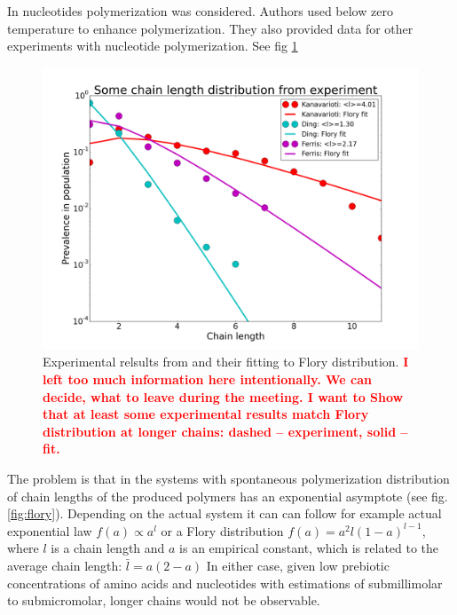 \documentclass[journal=jacsat,manuscript=article,layout=twocolumn]{achemso}
\newcommand*{\red}[1]{\textcolor{red}{#1}}
\begin{document}
In \cite{Kanavarioti2001} nucleotides polymerization was considered. Authors used below zero temperature to enhance polymerization. They also provided data for other experiments with nucleotide polymerization. See fig \ref{fig:some_flory}
\begin{figure}[h!]
  \centering
  \includegraphics[width=\columnwidth]{pictures/some_flory.png} 
  \caption{Experimental relsults from \cite{Kanavarioti2001} and their fitting to Flory 
distribution. \red{\textbf{I left too much information here intentionally. We can decide, 
what to leave during the meeting. I want to Show that at least some experimental results match 
Flory distribution at longer chains: dashed -- experiment, solid -- fit.}}}
  \label{fig:some_flory}
\end{figure}


The problem is that in the systems with spontaneous polymerization distribution of chain lengths 
of the produced polymers has an exponential asymptote  (see fig. \ref{fig:flory}). Depending on the 
actual system it can can follow for example actual exponential 
law  $f(a)\propto a^l$\cite{nowak2008prevolutionary,Derr2012} or a Flory distribution 
$f(a)=a^2l(1-a)^{l-1}$\cite{Flory1953}, where $l$ is a chain length and $a$ is an empirical 
constant, which is related to the average chain length: $\bar l = a(2- a)$
In either case, given low prebiotic concentrations of amino acids and nucleotides with estimations 
of submillimolar to submicromolar\cite{Aubrey2009,Kanavarioti2001,Lazcano1996}, longer chains 
would not be observable.
\end{document}
